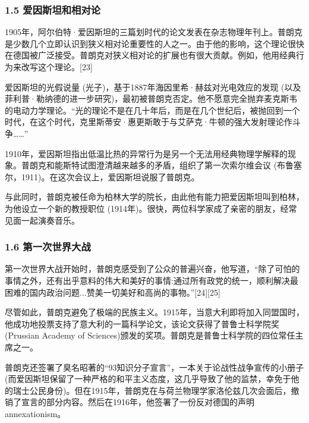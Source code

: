 \subsubsection{1.5 爱因斯坦和相对论}
1905年，阿尔伯特·爱因斯坦的三篇划时代的论文发表在杂志物理年刊上。普朗克是少数几个立即认识到狭义相对论重要性的人之一。由于他的影响，这个理论很快在德国被广泛接受。普朗克对狭义相对论的扩展也有很大贡献。例如，他用经典行为来改写这个理论。[23]

爱因斯坦的光假说量 (光子)，基于1887年海因里希·赫兹对光电效应的发现 (以及菲利普·勒纳德的进一步研究)，最初被普朗克否定。他不愿意完全抛弃麦克斯韦的电动力学理论。“光的理论不是在几十年后，而是在几个世纪后，被抛回到一个时代，在这个时代，克里斯蒂安·惠更斯敢于与艾萨克·牛顿的强大发射理论作斗争……”

1910年，爱因斯坦指出低温比热的异常行为是另一个无法用经典物理学解释的现象。普朗克和能斯特试图澄清越来越多的矛盾，组织了第一次索尔维会议 (布鲁塞尔，1911)。在这次会议上，爱因斯坦说服了普朗克。

与此同时，普朗克被任命为柏林大学的院长，由此他有能力把爱因斯坦叫到柏林，为他设立一个新的教授职位 (1914年)。很快，两位科学家成了亲密的朋友，经常见面一起演奏音乐。

\subsubsection{1.6 第一次世界大战}
第一次世界大战开始时，普朗克感受到了公众的普遍兴奋，他写道，“除了可怕的事情之外，还有出乎意料的伟大和美好的事情:通过所有政党的统一，顺利解决最困难的国内政治问题...赞美一切美好和高尚的事物。”[24][25]

尽管如此，普朗克避免了极端的民族主义。1915年，当意大利即将加入同盟国时，他成功地投票支持了意大利的一篇科学论文，该论文获得了普鲁士科学院奖(Prussian Academy of Sciences)颁发的奖项。普朗克是普鲁士科学院的四位常任主席之一。

普朗克还签署了臭名昭著的“93知识分子宣言”，一本关于论战性战争宣传的小册子 (而爱因斯坦保留了一种严格的和平主义态度，这几乎导致了他的监禁，幸免于他的瑞士公民身份)。但在1915年，普朗克在与荷兰物理学家洛伦兹几次会面后，撤销了宣言的部分内容。然后在1916年，他签署了一份反对德国的声明 annexationism。


